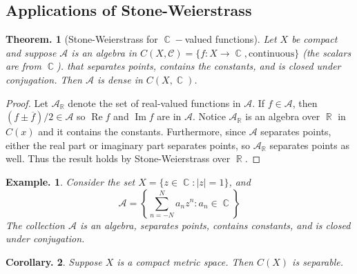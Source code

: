 \documentclass[11pt, a4paper]{memoir}
\DeclareMathOperator{\R}{{\mathbb{R}}}
\DeclareMathOperator{\C}{{\mathbb{C}}}
\theoremstyle{change}
\newtheorem{theorem}{Theorem.}[section]
\newtheorem{corollary}[theorem]{Corollary.}
\theoremstyle{plain}
\theoremstyle{nonumberplain}
\newtheorem{example}{Example.}
\newtheorem{proof}{Proof}
\renewcommand{\Re}{\ensuremath{\operatorname{Re}}}
\renewcommand{\Im}{\ensuremath{\operatorname{Im}}}
\renewcommand{\Re}{\ensuremath{\operatorname{Re}}}
\renewcommand{\Im}{\ensuremath{\operatorname{Im}}}
\numberwithin{equation}{section}
\begin{document}
\subsection{Applications of Stone-Weierstrass}
\begin{theorem}[Stone-Weierstrass for $\C-$valued functions]
    Let $X$ be compact and suppose $\mathcal{A}$ is an algebra in $C(X,\mathcal{C})=\{f:X\to\C,\text{continuous}\}$ (the scalars are from $\C$).
    that separates points, contains the constants, and is closed under conjugation.
    Then $\mathcal{A}$ is dense in $C(X,\C)$.
\end{theorem}
\begin{proof}
    Let $\mathcal{A}_{\R}$ denote the set of real-valued functions in $\mathcal{A}$.
    If $f\in\mathcal{A}$, then $(f\pm\overline{f})/2\in\mathcal{A}$ so $\Re f$ and $\Im f$ are in $\mathcal{A}$.
    Notice $\mathcal{A}_{\R}$ is an algebra over $\R$ in $C(x)$ and it contains the constants.
    Furthermore, since $\mathcal{A}$ separates points, either the real part or imaginary part separates points, so $\mathcal{A}_{\R}$ separates points as well.
    Thus the result holds by Stone-Weierstrass over $\R$.
\end{proof}
\begin{example}
    Consider the set $X=\{z\in\C:|z|=1\}$, and
    \[\mathcal{A}=\left\{\sum\limits_{n=-N}^Na_nz^n:a_n\in\C\right\}\]
    The collection $\mathcal{A}$ is an algebra, separates points, contains constants, and is closed under conjugation.
\end{example}
\begin{corollary}
    Suppose $X$ is a compact metric space.
    Then $C(X)$ is separable.
\end{corollary}
\end{document}
